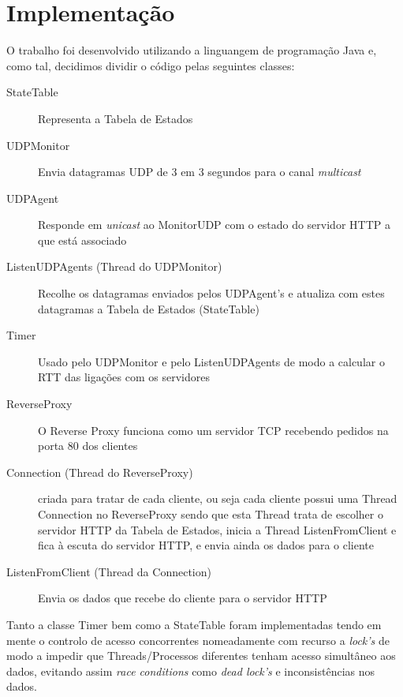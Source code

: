 \documentclass{article}
\begin{document}
\section{Implementação}
O trabalho foi desenvolvido utilizando a linguangem de programação Java e, como tal, decidimos dividir o código pelas seguintes classes:
\begin{description}
    \item [StateTable] Representa a Tabela de Estados
    \item [UDPMonitor] Envia datagramas UDP de 3 em 3 segundos para o canal \textit{multicast} 
    \item [UDPAgent] Responde em \textit{unicast} ao MonitorUDP com o estado do servidor HTTP a que está associado
    \item [ListenUDPAgents (Thread do UDPMonitor)] Recolhe os datagramas enviados pelos UDPAgent's e atualiza com estes datagramas a Tabela de Estados (StateTable)
    \item [Timer] Usado pelo UDPMonitor e pelo ListenUDPAgents de modo a calcular o RTT das ligações com os servidores
    \item [ReverseProxy] O Reverse Proxy funciona como um servidor TCP recebendo pedidos na porta 80 dos clientes
    \item [Connection (Thread do ReverseProxy)] criada para tratar de cada cliente, ou seja cada cliente possui uma Thread Connection no ReverseProxy sendo que esta Thread trata de escolher o servidor HTTP da Tabela de Estados, inicia a Thread ListenFromClient e fica à escuta do servidor HTTP, e envia ainda os dados para o cliente
    \item [ListenFromClient (Thread da Connection)] Envia os dados que recebe do cliente para o servidor HTTP
\end{description}

Tanto a classe Timer bem como a StateTable foram implementadas tendo em mente o controlo de acesso concorrentes nomeadamente com recurso a \textit{lock's} de modo a impedir que Threads/Processos diferentes tenham acesso simultâneo aos dados, evitando assim \textit{race conditions} como \textit{dead lock's} e inconsistências nos dados.
\end{document}
